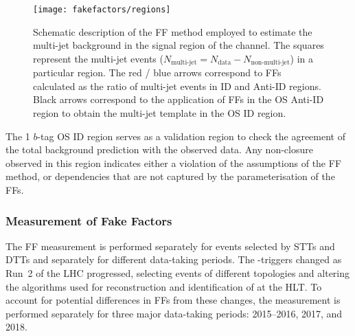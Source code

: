 \begin{figure}[htbp]
  \centering

  \texttt{[image: fakefactors/regions]}

  \caption{Schematic description of the FF method employed to estimate the
    multi-jet background in the signal region of the \hadhad channel. The
    squares represent the multi-jet events
    ($N_\text{multi-jet} = N_\text{data} - N_\text{non-multi-jet}$) in a
    particular region. The red / blue arrows correspond to FFs calculated as the
    ratio of multi-jet events in ID and Anti-ID regions. Black arrows correspond
    to the application of FFs in the OS Anti-ID region to obtain the multi-jet
    template in the OS ID region.}
  \label{fig:fakefactor_regions}
\end{figure}

The 1 $b$-tag OS ID region serves as a validation region to check the agreement
of the total background prediction with the observed data. Any non-closure
observed in this region indicates either a violation of the assumptions of the
FF method, or dependencies that are not captured by the parameterisation of the
FFs.



\subsubsection{Measurement of Fake Factors}

The FF measurement is performed separately for events selected by STTs and DTTs
and separately for different data-taking periods. The \tauhadvis-triggers
changed as Run~2 of the LHC progressed, selecting events of different topologies
and altering the algorithms used for reconstruction and identification of
\tauhadvis at the HLT. To account for potential differences in FFs from these
changes, the measurement is performed separately for three major data-taking
periods: 2015--2016, 2017, and 2018.

